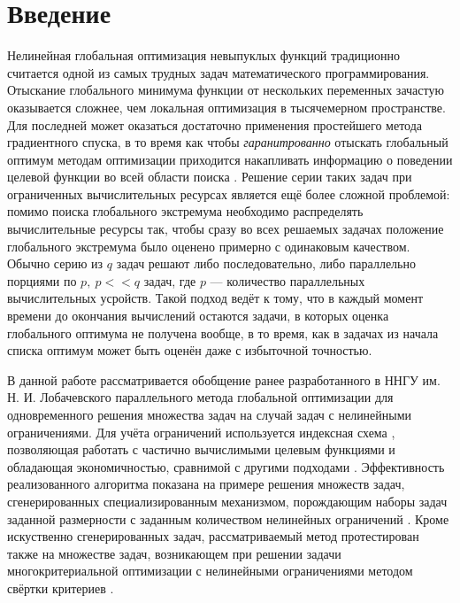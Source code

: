 \documentclass[11pt, oneside, a4paper]{article}
\begin{document}
\section{Введение}

Нелинейная глобальная оптимизация невыпуклых функций традиционно считается одной из самых трудных
задач математического программирования. Отыскание глобального минимума функции от нескольких переменных
зачастую оказывается сложнее, чем локальная оптимизация в тысячемерном пространстве. Для последней может оказаться достаточно
применения простейшего метода градиентного спуска, в то время как чтобы \textit{гаранитрованно} отыскать глобальный оптимум методам
оптимизации приходится накапливать информацию о поведении целевой функции во всей области поиска \cite{Jones2009,Paulavicius2011,Evtushenko2013,Strongin2000}. Решение серии таких задач при ограниченных вычислительных
ресурсах является ещё более сложной проблемой: помимо поиска глобального экстремума необходимо
распределять вычислительные ресурсы так, чтобы сразу во всех решаемых задачах положение глобального
экстремума было оценено примерно с одинаковым качеством. Обычно серию из \(q\) задач решают либо последовательно, либо
параллельно порциями по \(p,\:p<<q\) задач, где \(p\) --- количество параллельных вычислительных усройств.
Такой подход ведёт к тому, что в каждый момент времени до окончания вычислений
остаются задачи, в которых оценка глобального оптимума не получена вообще, в то время, как в задачах из начала
списка оптимум может быть оценён даже с избыточной точностью.

В данной работе рассматривается обобщение ранее разработанного в ННГУ им. Н. И. Лобачевского
параллельного метода глобальной оптимизации для одновременного решения множества задач \cite{BarkalovStrongin2018} на
случай задач с нелинейными ограничениями. Для учёта ограничений используется индексная схема \cite{Strongin2000},
позволяющая работать с частично вычислимыми целевым функциями и обладающая экономичностью,
сравнимой с другими подходами \cite{BarkalovLebedev2017}. Эффективность реализованного
алгоритма показана на примере решения множеств задач, сгенерированных специализированным
механизмом, порождающим наборы задач заданной размерности с заданным количеством нелинейных ограничений \cite{GergelBarkalov2019}.
Кроме искуственно сгенерированных задач, рассматриваемый метод протестирован также
на множестве задач, возникающем при решении задачи многокритериальной оптимизации
с нелинейными ограничениями методом свёртки критериев \cite{Ehrgott2005}.
\end{document}
